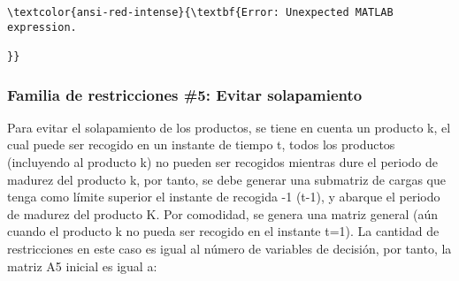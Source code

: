 \documentclass[11pt]{article}
\begin{document}
    \begin{Verbatim}[commandchars=\\\{\}]
\textcolor{ansi-red-intense}{\textbf{Error: Unexpected MATLAB expression.

}}
    \end{Verbatim}

    \hypertarget{familia-de-restricciones-5-evitar-solapamiento}{%
\subsubsection{Familia de restricciones \#5: Evitar
solapamiento}\label{familia-de-restricciones-5-evitar-solapamiento}}

Para evitar el solapamiento de los productos, se tiene en cuenta un
producto k, el cual puede ser recogido en un instante de tiempo t, todos
los productos (incluyendo al producto k) no pueden ser recogidos
mientras dure el periodo de madurez del producto k, por tanto, se debe
generar una submatriz de cargas que tenga como límite superior el
instante de recogida -1 (t-1), y abarque el periodo de madurez del
producto K. Por comodidad, se genera una matriz general (aún cuando el
producto k no pueda ser recogido en el instante t=1). La cantidad de
restricciones en este caso es igual al número de variables de decisión,
por tanto, la matriz A5 inicial es igual a:
\end{document}
